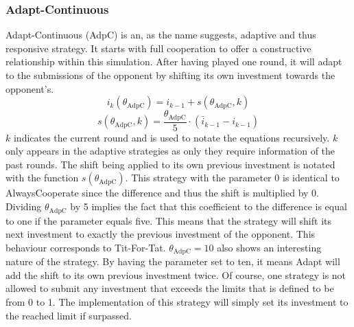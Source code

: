 \documentclass[11pt]{article}
\begin{document}
\subsubsection*{Adapt-Continuous}
Adapt-Continuous (AdpC) is an, as the name suggests, adaptive and thus responsive strategy.
It starts with full cooperation to offer a constructive relationship within this simulation.
After having played one round, it will adapt to the submissions of the opponent by shifting its own investment towards the opponent's.
$$i_k(\theta_{\mathrm{AdpC}}) = i_{k-1} + s(\theta_{\mathrm{AdpC}}, k)$$
$$s(\theta_{\mathrm{AdpC}}, k) = \frac{\theta_{\mathrm{AdpC}}}{5} \cdot (\bar i_{k-1} - i_{k-1})$$
$k$ indicates the current round and is used to notate the equations recursively.
$k$ only appears in the adaptive strategies as only they require information of the past rounds.
The shift being applied to its own previous investment is notated with the function $s(\theta_{\mathrm{AdpC}})$.
This strategy with the parameter 0 is identical to AlwaysCooperate since the difference and thus the shift is multiplied by 0.
Dividing $\theta_{\mathrm{AdpC}}$ by 5 implies the fact that this coefficient to the difference is equal to one if the parameter equals five.
This means that the strategy will shift its next investment to exactly the previous investment of the opponent.
This behaviour corresponds to Tit-For-Tat.
$\theta_{\mathrm{AdpC}} = 10$ also shows an interesting nature of the strategy.
By having the parameter set to ten, it means Adapt will add the shift to its own previous investment twice.
Of course, one strategy is not allowed to submit any investment that exceeds the limits that is defined to be from 0 to 1.
The implementation of this strategy will simply set its investment to the reached limit if surpassed.\\
\end{document}
